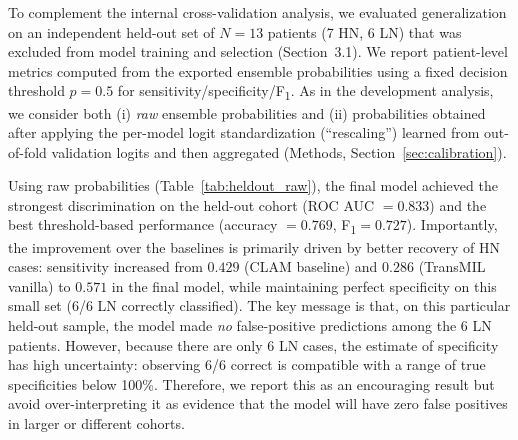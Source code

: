 To complement the internal cross-validation analysis, we evaluated generalization on an independent held-out set of $N=13$ patients (7 HN, 6 LN) that was excluded from model training and selection (Section~3.1). We report patient-level metrics computed from the exported ensemble probabilities using a fixed decision threshold $p=0.5$ for sensitivity/specificity/F\textsubscript{1}. As in the development analysis, we consider both (i) \emph{raw} ensemble probabilities and (ii) probabilities obtained after applying the per-model logit standardization (“rescaling”) learned from out-of-fold validation logits and then aggregated (Methods, Section~\ref{sec:calibration}).

\begin{table}[!t]
\centering
\caption{Held-out test set performance ($N=13$) using \textbf{raw} ensemble probabilities with a fixed threshold $p=0.5$.}
\label{tab:heldout_raw}
\end{table}

Using raw probabilities (Table~\ref{tab:heldout_raw}), the final model achieved the strongest discrimination on the held-out cohort (ROC AUC $=0.833$) and the best threshold-based performance (accuracy $=0.769$, F\textsubscript{1}$=0.727$). Importantly, the improvement over the baselines is primarily driven by better recovery of HN cases: sensitivity increased from $0.429$ (CLAM baseline) and $0.286$ (TransMIL vanilla) to $0.571$ in the final model, while maintaining perfect specificity on this small set (6/6 LN correctly classified). The key message is that, on this particular held-out sample, the model made \emph{no} false-positive predictions among the 6 LN patients. However, because there are only 6 LN cases, the estimate of specificity has high uncertainty: observing 6/6 correct is compatible with a range of true specificities below 100\%. Therefore, we report this as an encouraging result but avoid over-interpreting it as evidence that the model will have zero false positives in larger or different cohorts.

